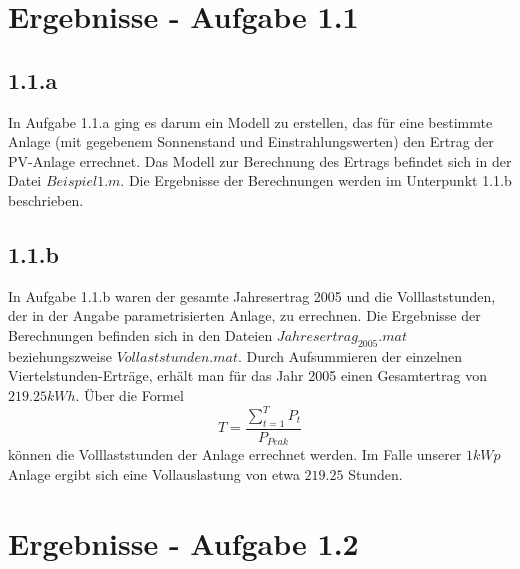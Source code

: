 \documentclass[a4paper,12pt]{article}
\begin{document}
	\section{Ergebnisse - Aufgabe 1.1}
	\subsection{1.1.a}
	In Aufgabe 1.1.a ging es darum ein Modell zu erstellen, das für eine bestimmte Anlage (mit gegebenem Sonnenstand und Einstrahlungswerten) den Ertrag der PV-Anlage errechnet.\newline
	Das Modell zur Berechnung des Ertrags befindet sich in der Datei $Beispiel1.m$. Die Ergebnisse der Berechnungen werden im Unterpunkt 1.1.b beschrieben.
	\subsection{1.1.b}
	In Aufgabe 1.1.b waren der gesamte Jahresertrag 2005 und die Volllaststunden, der in der Angabe parametrisierten Anlage, zu errechnen.\newline
	Die Ergebnisse der Berechnungen befinden sich in den Dateien $Jahresertrag_2005.mat$ beziehungszweise $Vollaststunden.mat$.\newline
	Durch Aufsummieren der einzelnen Viertelstunden-Erträge, erhält man für das Jahr 2005 einen Gesamtertrag von $219.25kWh$.\newline
	Über die Formel
	\begin{equation}
	T=\frac{\sum \limits_{t=1}^T P_t}{P_{Peak}}
	\end{equation}
	können die Volllaststunden der Anlage errechnet werden. Im Falle unserer $1kWp$ Anlage ergibt sich eine Vollauslastung von etwa $219.25$ Stunden.
	\section{Ergebnisse - Aufgabe 1.2}
\end{document}
